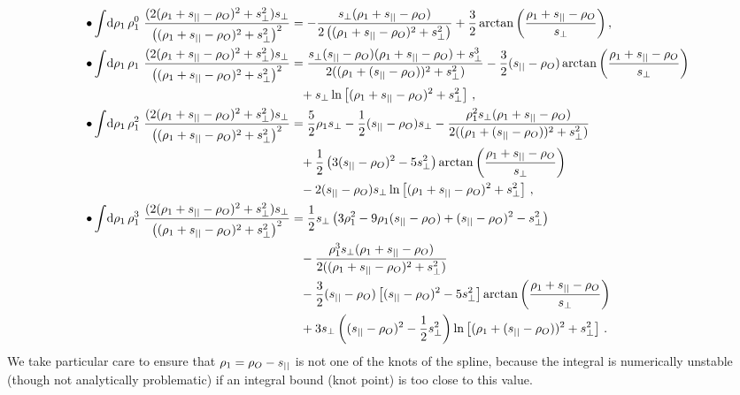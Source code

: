 \documentclass[fleqn,usenatbib]{mnras}
\begin{document}
    \begin{align}
       \bullet \int\!\dif{\rho_1}\, \rho_1^0~ \frac{(2(\rho_1+\spll-\rho_O)^2 + \sprp^2)\sprp}{\left(( \rho_1+\spll-\rho_O)^2+\sprp^2\right)^2}
            &= - \frac{\sprp(\rho_1+\spll-\rho_O)}
                      {2 \left((\rho_1+\spll-\rho_O)^2+\sprp^2\right)}
               + \frac{3}{2} \arctan{\left(\frac{\rho_1+\spll-\rho_O}{\sprp}\right)} \,,
        \\
        \bullet \int\!\dif{\rho_1}\,  \rho_1~ \frac{(2(\rho_1+\spll-\rho_O)^2 + \sprp^2)\sprp}{\left(( \rho_1+\spll-\rho_O)^2+\sprp^2\right)^2}
            &= \frac{\sprp(\spll-\rho_O) (\rho_1 +\spll-\rho_O ) + \sprp^3}
                    {2 ((\rho_1 + (\spll-\rho_O))^2 + \sprp^2)  }
               - \frac{3}{2} (\spll-\rho_O) \arctan\left(\frac{\rho_1 + \spll-\rho_O}{\sprp}\right)
            \\
            &\phantom{=} + \sprp \ln\left[(\rho_1 + \spll-\rho_O)^2 + \sprp^2\right]   \,, \nonumber
        \\
        \bullet \int\!\dif{\rho_1}\, \rho_1^2~ \frac{(2(\rho_1+\spll-\rho_O)^2 + \sprp^2)\sprp}{\left(( \rho_1+\spll-\rho_O)^2+\sprp^2\right)^2}
            &=   \frac{5}{2} \rho_1 \sprp
               - \frac{1}{2} (\spll-\rho_O) \sprp
               - \frac{\rho_1^2 \sprp(\rho_1+\spll - \rho_O)}
                      {2 ((\rho_1 + (\spll-\rho_O))^2 + \sprp^2)}
            \\ \nonumber
            &\phantom{=} + \frac{1}{2} \left(3(\spll-\rho_O)^2 - 5\sprp^2 \right) \arctan\left( \frac{\rho_1 + \spll - \rho_O} {\sprp} \right)
            \\ \nonumber
            &\phantom{=} - 2 (\spll-\rho_O) \sprp \ln\left[(\rho_1 + \spll-\rho_O)^2 + \sprp^2\right] \,,
        \\
        \bullet \int\!\dif{\rho_1}\, \rho_1^3~ \frac{(2(\rho_1+\spll-\rho_O)^2 + \sprp^2)\sprp}{\left(( \rho_1+\spll-\rho_O)^2+\sprp^2\right)^2}
            &=  \frac{1}{2}\sprp \left( 3\rho_1^2  - 9 \rho_1 (\spll-\rho_O)  + (\spll-\rho_O)^2  - \sprp^2 \right)
            \\ \nonumber
            &\phantom{=} - \frac{\rho_1^3 \sprp (\rho_1+\spll - \rho_O)} {2 ((\rho_1 + \spll - \rho_O)^2 + \sprp^2)}
            \\ \nonumber
            &\phantom{=} - \frac{3}{2} (\spll-\rho_O) \left[(\spll-\rho_O)^2 - 5 \sprp^2\right] \arctan\left( \frac{\rho_1 + \spll - \rho_O}{\sprp} \right)
            \\ \nonumber
            &\phantom{=} + 3 \sprp  \left((\spll-\rho_O)^2 - \frac{1}{2} \sprp^2\right) \ln\left[(\rho_1 + (\spll-\rho_O))^2 + \sprp^2\right]\,.
    \end{align}
    We take particular care to ensure that $\rho_1=\rho_O-s_{||}$ is not one of
    the knots of the spline, because the integral is numerically unstable
    (though not analytically problematic) if an integral bound (knot point) is
    too close to this value.
\end{document}
